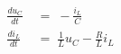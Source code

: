 \documentclass[12pt]{article}
\begin{document}
\sicpsize

\begin{align*}
\frac{du_C}{dt} \; &= \; - \frac{i_L}{C}\\
\frac{di_L}{dt} \; &= \; \frac{1}{L}u_C - \frac{R}{L}i_L
\end{align*}
\end{document}
